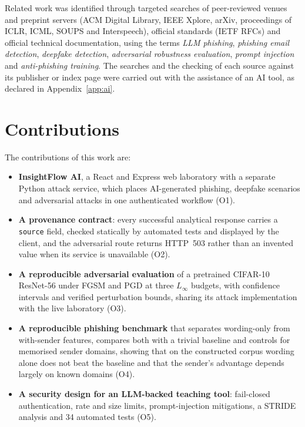 Related work was identified through targeted searches of peer-reviewed venues and preprint servers (ACM Digital Library, IEEE Xplore, arXiv, proceedings of ICLR, ICML, SOUPS and Interspeech), official standards (IETF RFCs) and official technical documentation, using the terms \emph{LLM phishing}, \emph{phishing email detection}, \emph{deepfake detection}, \emph{adversarial robustness evaluation}, \emph{prompt injection} and \emph{anti-phishing training}. The searches and the checking of each source against its publisher or index page were carried out with the assistance of an AI tool, as declared in Appendix~\ref{app:ai}.

\section{Contributions}
\label{sec:contrib}

The contributions of this work are:

\begin{itemize}
\item \textbf{InsightFlow AI}, a React and Express web laboratory with a separate Python attack service, which places AI-generated phishing, deepfake scenarios and adversarial attacks in one authenticated workflow (O1).
\item \textbf{A provenance contract}: every successful analytical response carries a \texttt{source} field, checked statically by automated tests and displayed by the client, and the adversarial route returns HTTP~503 rather than an invented value when its service is unavailable (O2).
\item \textbf{A reproducible adversarial evaluation} of a pretrained CIFAR-10 ResNet-56 under FGSM and PGD at three $L_\infty$ budgets, with confidence intervals and verified perturbation bounds, sharing its attack implementation with the live laboratory (O3).
\item \textbf{A reproducible phishing benchmark} that separates wording-only from with-sender features, compares both with a trivial baseline and controls for memorised sender domains, showing that on the constructed corpus wording alone does not beat the baseline and that the sender's advantage depends largely on known domains (O4).
\item \textbf{A security design for an LLM-backed teaching tool}: fail-closed authentication, rate and size limits, prompt-injection mitigations, a STRIDE analysis and 34 automated tests (O5).
\end{itemize}

